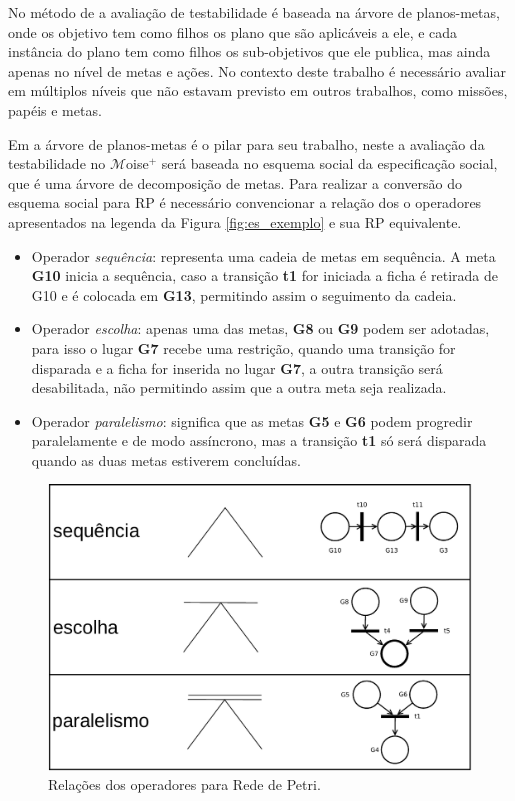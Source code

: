 No método de \cite{winikoff2014testability,winikoff2017bdi} a avaliação de testabilidade é baseada na árvore de planos-metas, onde os objetivo tem como filhos os plano que são aplicáveis a ele, e cada instância do plano tem como filhos os sub-objetivos que ele publica, mas ainda apenas no nível de metas e ações. No contexto deste trabalho é necessário avaliar em múltiplos níveis que não estavam previsto em outros trabalhos, como missões, papéis e metas.

Em \cite{winikoff2014testability} a árvore de planos-metas é o pilar para seu trabalho, neste a avaliação da testabilidade no $\mathcal{M}$oise$^{+}$ será baseada no esquema social da especificação social, que é uma árvore de decomposição de metas. Para realizar a conversão do esquema social para RP é necessário convencionar a relação dos o operadores apresentados na legenda da Figura \ref{fig:es_exemplo} e sua RP equivalente.

\begin{itemize}

\item Operador \textit{sequência}: representa uma cadeia de metas em sequência. A meta \textbf{G10} inicia a sequência, caso a transição \textbf{t1} for iniciada a ficha é retirada de G10 e é colocada em \textbf{G13}, permitindo assim o seguimento da cadeia. 

\item Operador \textit{escolha}: apenas uma das metas, \textbf{G8} ou \textbf{G9} podem ser adotadas, para isso o lugar \textbf{G7} recebe uma restrição, quando uma transição for disparada e a ficha for inserida no lugar \textbf{G7}, a outra transição será desabilitada, não permitindo assim que a outra meta seja realizada. 

\item Operador \textit{paralelismo}: significa que as metas \textbf{G5} e \textbf{G6} podem progredir paralelamente e de modo assíncrono, mas a transição \textbf{t1} só será disparada quando as duas metas estiverem concluídas.

\end{itemize}

\begin{figure}[ht]
\centering
\includegraphics[scale=0.4]{imagens/4-relacao-moise-rp.pdf}
\caption{Relações dos operadores para Rede de Petri.}
\label{fig:moise_rp}
\end{figure}

